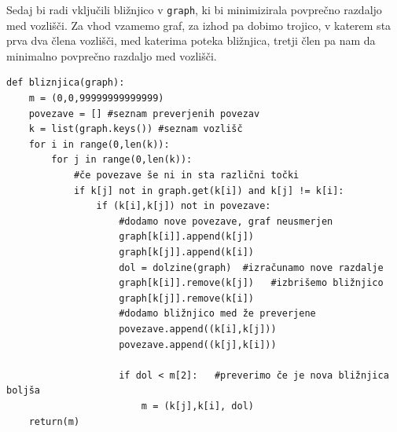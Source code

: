 \documentclass[a4paper,10pt]{article}
\begin{document}
Sedaj bi radi vključili bližnjico v \texttt{graph}, ki bi minimizirala povprečno razdaljo med vozlišči. Za vhod vzamemo graf, za izhod pa dobimo trojico, v katerem sta prva dva člena vozlišči, med katerima poteka bližnjica, tretji člen pa nam da minimalno povprečno razdaljo med vozlišči.

\begin{verbatim}
def bliznjica(graph):
    m = (0,0,99999999999999)
    povezave = [] #seznam preverjenih povezav
    k = list(graph.keys()) #seznam vozlišč
    for i in range(0,len(k)):
        for j in range(0,len(k)):
            #če povezave še ni in sta različni točki
            if k[j] not in graph.get(k[i]) and k[j] != k[i]:
                if (k[i],k[j]) not in povezave:
                    #dodamo nove povezave, graf neusmerjen
                    graph[k[i]].append(k[j])
                    graph[k[j]].append(k[i])
                    dol = dolzine(graph)  #izračunamo nove razdalje
                    graph[k[i]].remove(k[j])   #izbrišemo bližnjico
                    graph[k[j]].remove(k[i])
                    #dodamo bližnjico med že preverjene
                    povezave.append((k[i],k[j]))
                    povezave.append((k[j],k[i]))

                    if dol < m[2]:   #preverimo če je nova bližnjica boljša
                        m = (k[j],k[i], dol)
    return(m)
\end{verbatim}
\end{document}
